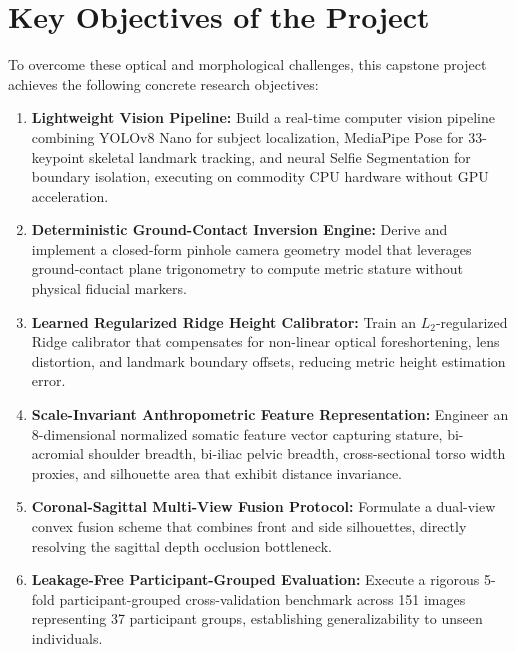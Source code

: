 \documentclass[12pt,a4paper,oneside]{report}
\begin{document}
\section{Key Objectives of the Project}
To overcome these optical and morphological challenges, this capstone project achieves the following concrete research objectives:
\begin{enumerate}[label=\arabic*.]
    \item \textbf{Lightweight Vision Pipeline:} Build a real-time computer vision pipeline combining YOLOv8 Nano for subject localization, MediaPipe Pose for 33-keypoint skeletal landmark tracking, and neural Selfie Segmentation for boundary isolation, executing on commodity CPU hardware without GPU acceleration.
    \item \textbf{Deterministic Ground-Contact Inversion Engine:} Derive and implement a closed-form pinhole camera geometry model that leverages ground-contact plane trigonometry to compute metric stature without physical fiducial markers.
    \item \textbf{Learned Regularized Ridge Height Calibrator:} Train an $L_2$-regularized Ridge calibrator that compensates for non-linear optical foreshortening, lens distortion, and landmark boundary offsets, reducing metric height estimation error.
    \item \textbf{Scale-Invariant Anthropometric Feature Representation:} Engineer an 8-dimensional normalized somatic feature vector capturing stature, bi-acromial shoulder breadth, bi-iliac pelvic breadth, cross-sectional torso width proxies, and silhouette area that exhibit distance invariance.
    \item \textbf{Coronal-Sagittal Multi-View Fusion Protocol:} Formulate a dual-view convex fusion scheme that combines front and side silhouettes, directly resolving the sagittal depth occlusion bottleneck.
    \item \textbf{Leakage-Free Participant-Grouped Evaluation:} Execute a rigorous 5-fold participant-grouped cross-validation benchmark across 151 images representing 37 participant groups, establishing generalizability to unseen individuals.
\end{enumerate}
\end{document}
